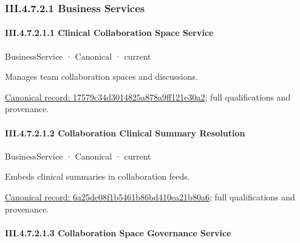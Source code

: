 \subsubsection*{III.4.7.2.1 Business Services}
\label{navigation:III.4.7.2.1}

\paragraph*{III.4.7.2.1.1 Clinical Collaboration Space Service}
\label{navigation:III.4.7.2.1.1}

\label{element:17579c34d3014825a878a9ff121e30a2}
{\small BusinessService · Canonical · current}\par

Manages team collaboration spaces and discussions.


{\footnotesize \href{../../../../../../../continuum/business/business-service/17579c34d3014825a878a9ff121e30a2.md}{Canonical record: 17579c34d3014825a878a9ff121e30a2}; full qualifications and provenance.}\par
\paragraph*{III.4.7.2.1.2 Collaboration Clinical Summary Resolution}
\label{navigation:III.4.7.2.1.2}

\label{element:6a25de08f1b5461b86bd410ea21b80a6}
{\small BusinessService · Canonical · current}\par

Embeds clinical summaries in collaboration feeds.


{\footnotesize \href{../../../../../../../continuum/business/business-service/6a25de08f1b5461b86bd410ea21b80a6.md}{Canonical record: 6a25de08f1b5461b86bd410ea21b80a6}; full qualifications and provenance.}\par
\paragraph*{III.4.7.2.1.3 Collaboration Space Governance Service}
\label{navigation:III.4.7.2.1.3}


